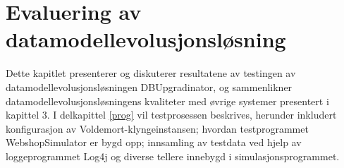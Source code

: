
\chapter{Evaluering av datamodellevolusjonsløsning}

Dette kapitlet presenterer og diskuterer resultatene av testingen av datamodellevolusjonsløsningen DBUpgradinator, og sammenlikner datamodellevolusjonsløsningens kvaliteter med øvrige systemer presentert i kapittel 3. I delkapittel \ref{prog} vil testprosessen beskrives, herunder inkludert konfigurasjon av Voldemort-klyngeinstansen; hvordan testprogrammet WebshopSimulator er bygd opp; innsamling av testdata ved hjelp av loggeprogrammet Log4j og diverse tellere innebygd i simulasjonsprogrammet.




\cleardoublepage

